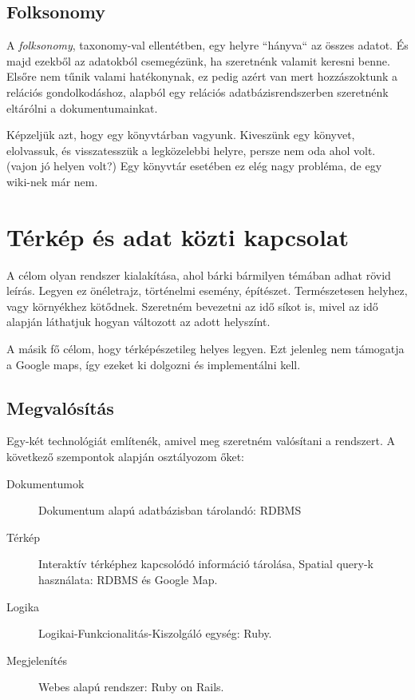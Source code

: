 	\subsection{Folksonomy} A \emph{folksonomy}, taxonomy-val ellentétben, egy helyre ``hányva`` az összes adatot. És majd ezekből az adatokból csemegézünk, ha szeretnénk valamit keresni benne. Elsőre nem tűnik valami hatékonynak, ez pedig azért van mert hozzászoktunk a relációs gondolkodáshoz, alapból egy relációs adatbázisrendszerben szeretnénk eltárólni a dokumentumainkat.

	Képzeljük azt, hogy egy könyvtárban vagyunk. Kiveszünk egy könyvet, elolvassuk, és visszatesszük a legközelebbi helyre, persze nem oda ahol volt. (vajon jó helyen volt?) Egy könyvtár esetében ez elég nagy probléma, de egy wiki-nek már nem.

\section{Térkép és adat közti kapcsolat}
	A célom olyan rendszer kialakítása, ahol bárki bármilyen témában adhat rövid leírás. Legyen ez önéletrajz, történelmi esemény, építészet. Természetesen helyhez, vagy környékhez kötődnek. Szeretném bevezetni az idő síkot is, mivel az idő alapján láthatjuk hogyan változott az adott helyszínt.

	A másik fő célom, hogy térképészetileg helyes legyen. Ezt jelenleg nem támogatja a Google maps, így ezeket ki dolgozni és implementálni kell.

	\subsection{Megvalósítás}
	Egy-két technológiát említenék, amivel meg szeretném valósítani a rendszert.
	A következő szempontok alapján osztályozom őket:
	\begin{description}
		\item [Dokumentumok] Dokumentum alapú adatbázisban tárolandó: RDBMS
		\item [Térkép] Interaktív térképhez kapcsolódó információ tárolása, Spatial query-k használata: RDBMS és Google Map.
		\item [Logika] Logikai-Funkcionalitás-Kiszolgáló egység: Ruby.
		\item [Megjelenítés] Webes alapú rendszer: Ruby on Rails.
	\end{description}
